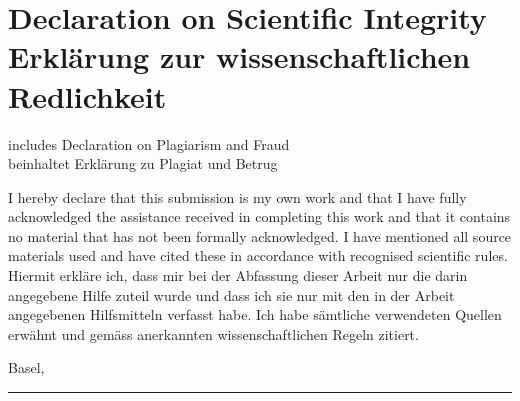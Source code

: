 \chapter[Declaration on Scientific Integrity]{Declaration on Scientific Integrity\\Erklärung zur wissenschaftlichen Redlichkeit}
\label{DeclarationOfAuthorship}

includes Declaration on Plagiarism and Fraud \\
beinhaltet Erklärung zu Plagiat und Betrug \vspace{1cm}

\authorsint

\immatriculnrint

\titleint

\thesistypeint

I hereby declare that this submission is my own work and that I have fully acknowledged the assistance received in completing this work and that it contains no material that has not been formally acknowledged. 
I have mentioned all source materials used and have cited these in accordance with recognised scientific rules.
\vspace{0.3cm}
Hiermit erkläre ich, dass mir bei der Abfassung dieser Arbeit nur die darin angegebene 
Hilfe zuteil wurde und dass ich sie nur mit den in der Arbeit angegebenen Hilfsmitteln 
verfasst habe. Ich habe sämtliche verwendeten Quellen erwähnt und gemäss anerkannten wissenschaftlichen Regeln zitiert. 


\vspace*{0.5cm}

Basel, \dateint
\vspace*{0.25cm}

\begin{flushright}
\rule{75mm}{0.4pt} \\
\end{flushright}
